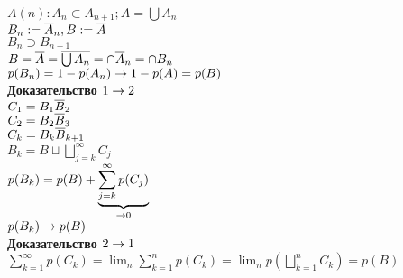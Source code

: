 \documentclass[12pt]{article}
\begin{document}
$A(n): A_n \subset A_{n+1}; A = \bigcup A_n$\\
$B_n := \ol A_n, B := \ol A$\\
$B_n \supset B_{n+1}$\\
$B = \ol A = \ol{\bigcup A_n} = \cap \ol A_n = \cap B_n$\\
$p(B_n) = 1 - p(A_n) \rto 1 - p(A) = p(B)$\\
\textbf{Доказательство $1 \rto 2$}\\
$C_1 = B_1\ol B_2$\\
$C_2 = B_2\ol B_3$\\
$C_k = B_k\ol B_{k+1}$\\
$B_k = B \sqcup \bigsqcup_{j=k}^\infty C_j$\\
$p(B_k) = p(B) + \ub{\rto 0}{\sum_{j=k}^\infty p(C_j)}$\\
$p(B_k) \rto p(B)$\\
\textbf{Доказательство $2 \rto 1$}\\
$\sum_{k=1}^\infty p(C_k) = \lim_n \sum_{k=1}^n p(C_k) = \lim_n p(\bigsqcup_{k=1}^n C_k) = p(B)$
\end{document}
